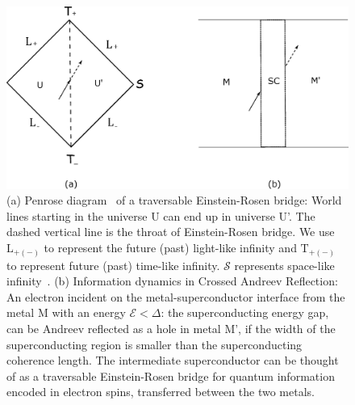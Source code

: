 \documentclass[12pt,letterpaper,aps,onecolumn,superscriptaddress,floatfix,notitlepage]{revtex4-1}
\begin{document}
	\begin{figure}
		\includegraphics[scale=0.4]{fig6.eps}
		\caption{(a) Penrose diagram~\cite{penrose2011republication} of a traversable Einstein-Rosen bridge: World lines starting in the universe U can end up in universe U'. The dashed vertical line is the throat of Einstein-Rosen bridge. We use $\text{L}_{+(-)}$ to represent the future (past) light-like infinity and $\text{T}_{+(-)}$ to represent future (past) time-like infinity. $\mathcal{S}$ represents space-like infinity~\cite{penrose}. (b) Information dynamics in Crossed Andreev Reflection: An electron incident on the metal-superconductor interface from the metal M with an energy $\mathcal{E} <\Delta$: the superconducting energy gap, can be Andreev reflected as a hole in metal M', if the width of the superconducting region is smaller than the superconducting coherence length. The intermediate superconductor can be thought of as a traversable Einstein-Rosen bridge for quantum information encoded in electron spins, transferred between the two metals.\label{car}}
	\end{figure}
\end{document}
